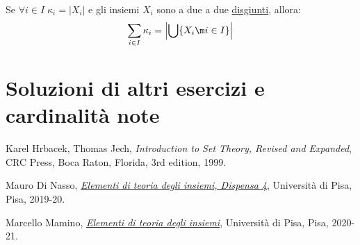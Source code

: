 \documentclass[11pt]{scrartcl}
\begin{document}
\begin{note}
	Se $\forall i \in I \; \kappa_i = |X_i|$ e gli insiemi $X_i$ sono a due a due \underline{disgiunti}, allora:
	\[ \sum_{i \in I} \kappa_i = \left\lvert \bigcup\{X_i \m i \in I\}\right\rvert 
		\]
\end{note}


\pagebreak
\appendix
\section{Soluzioni di altri esercizi e cardinalità note}
\pagebreak
\begin{thebibliography}{9}
	Karel Hrbacek, Thomas Jech,
	\textit{Introduction to Set Theory, Revised and Expanded},
	CRC Press, Boca Raton, Florida,
	3rd edition,
	1999.

	Mauro Di Nasso,
	\href{https://people.dm.unipi.it/dinasso/ETI/dispensa-04ss.pdf}{\textit{Elementi di teoria degli insiemi, Dispensa 4}},
	Università di Pisa, Pisa,
	2019-20.


	Marcello Mamino,
	\href{https://ciovil.li/eti20/}{\textit{Elementi di teoria degli insiemi}},
	Università di Pisa, Pisa,
	2020-21.
\end{thebibliography}
\end{document}
